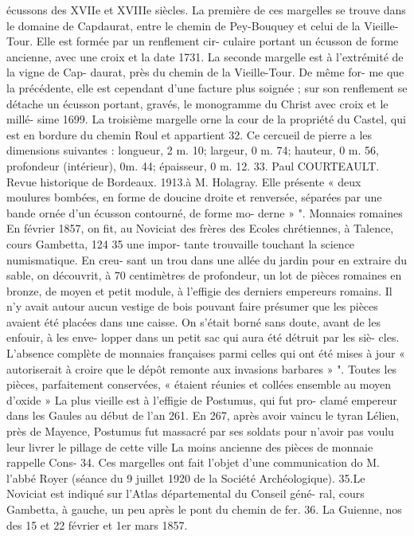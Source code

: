 \documentclass[a4paper,11pt]{book}
\begin{document}
écussons des XVIIe et XVIIIe siècles.
La première de ces margelles se trouve dans le domaine
de Capdaurat, entre le chemin de Pey-Bouquey et celui
de la Vieille-Tour. Elle est formée par un renflement cir-
culaire portant un écusson de forme ancienne, avec une
croix et la date 1731.
La seconde margelle est à l'extrémité de la vigne de Cap-
daurat, près du chemin de la Vieille-Tour. De même for-
me que la précédente, elle est cependant d'une facture plus
soignée ; sur son renflement se détache un écusson portant,
gravés, le monogramme du Christ avec croix et le millé-
sime 1699.
La troisième margelle orne la cour de la propriété du
Castel, qui est en bordure du chemin Roul et appartient
32. Ce cercueil de pierre a les dimensions suivantes : longueur,
2 m. 10; largeur, 0 m. 74; hauteur, 0 m. 56, profondeur (intérieur), 0m. 44;
épaisseur, 0 m. 12.
33. Paul COURTEAULT. Revue historique de Bordeaux. 1913.à M. Holagray. Elle présente « deux moulures bombées,
en forme de doucine droite et renversée, séparées par une
bande ornée d'un écusson contourné, de forme mo-
derne » ".
Monnaies romaines
En février 1857, on fit, au Noviciat des frères des Ecoles
chrétiennes, à Talence, cours Gambetta, 124 35 une impor-
tante trouvaille touchant la science numismatique. En creu-
sant un trou dans une allée du jardin pour en extraire
du sable, on découvrit, à 70 centimètres de profondeur,
un lot de pièces romaines en bronze, de moyen et petit
module, à l'effigie des derniers empereurs romains. Il n'y
avait autour aucun vestige de bois pouvant faire présumer
que les pièces avaient été placées dans une caisse. On
s'était borné sans doute, avant de les enfouir, à les enve-
lopper dans un petit sac qui aura été détruit par les siè-
cles. L'absence complète de monnaies françaises parmi
celles qui ont été mises à jour « autoriserait à croire que
le dépôt remonte aux invasions barbares » ".
Toutes les pièces, parfaitement conservées, « étaient
réunies et collées ensemble au moyen d'oxide »
La plus vieille est à l'effigie de Postumus, qui fut pro-
clamé empereur dans les Gaules au début de l'an 261. En
267, après avoir vaincu le tyran Lélien, près de Mayence,
Postumus fut massacré par ses soldats pour n'avoir pas
voulu leur livrer le pillage de cette ville
La moins ancienne des pièces de monnaie rappelle Cons-
34. Ces margelles ont fait l'objet d'une communication do M. l'abbé
Royer (séance du 9 juillet 1920 de la Société Archéologique).
35.Le Noviciat est indiqué sur l'Atlas départemental du Conseil géné-
ral, cours Gambetta, à gauche, un peu après le pont du chemin de fer.
36. La Guienne, nos des 15 et 22 février et 1er mars 1857.
\end{document}
